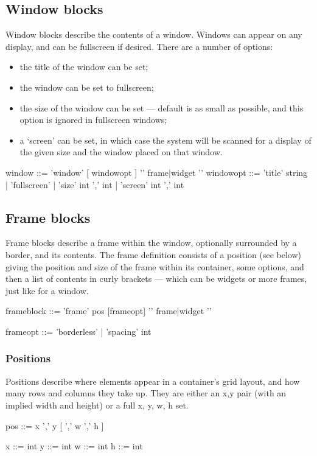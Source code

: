\subsection{Window blocks}
Window blocks describe the contents of a window. Windows can appear
on any display, and can be fullscreen if desired.
There are a number of options:
\begin{itemize}
\item the title of the window can be set;
\item the window can be set to fullscreen;
\item the size of the window can be set --- default is as small as possible, and this option
is ignored in fullscreen windows;
\item a `screen' can be set, in which case the system will be scanned for a display of the given
size and the window placed on that window.
\end{itemize}

\begin{v}
window      ::= 'window' [ {windowopt} ] '{' {frame|widget} '}'
windowopt   ::= 'title' string
            |   'fullscreen'
            |   'size' int ',' int
            |   'screen' int ',' int
\end{v}


\subsection{Frame blocks}
Frame blocks describe a frame within the window, optionally surrounded by a border, and its contents.
The frame definition consists of a position (see below) giving the position and size of the frame within its container,
some options, and then a list of contents in curly brackets --- which can be widgets or more frames, just like for a window.
\begin{v}
frameblock  ::= 'frame' pos [{frameopt}] '{' {frame|widget} '}'

frameopt    ::= 'borderless'
            |   'spacing' int

\end{v}

\subsubsection{Positions}
Positions describe where elements appear in a container's
grid layout, and how many rows and columns they take up. They
are either an x,y pair (with an implied width and height) or a full
x, y, w, h set.
\begin{v}
pos         ::=  x ',' y [ ',' w ',' h ]

x           ::= int
y           ::= int
w           ::= int
h           ::= int
\end{v}

